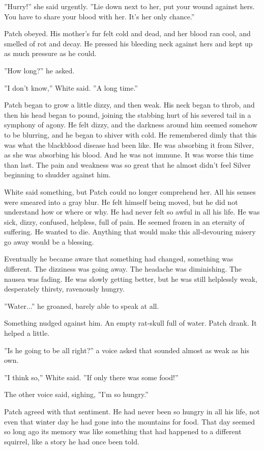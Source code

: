 \documentclass[12pt]{book}
\begin{document}
''Hurry!'' she said urgently. ''Lie down next to her, put your wound against hers. You have to share your blood with her. It's her only chance.''\par
Patch obeyed. His mother's fur felt cold and dead, and her blood ran cool, and smelled of rot and decay. He pressed his bleeding neck against hers and kept up as much pressure as he could.\par
''How long?'' he asked.\par
''I don't know,'' White said. ''A long time.''\par
Patch began to grow a little dizzy, and then weak. His neck began to throb, and then his head began to pound, joining the stabbing hurt of his severed tail in a symphony of agony. He felt dizzy, and the darkness around him seemed somehow to be blurring, and he began to shiver with cold. He remembered dimly that this was what the blackblood disease had been like. He was absorbing it from Silver, as she was absorbing his blood. And he was not immune. It was worse this time than last. The pain and weakness was so great that he almost didn't feel Silver beginning to shudder against him.\par
White said something, but Patch could no longer comprehend her. All his senses were smeared into a gray blur. He felt himself being moved, but he did not understand how or where or why. He had never felt so awful in all his life. He was sick, dizzy, confused, helpless, full of pain. He seemed frozen in an eternity of suffering. He wanted to die. Anything that would make this all-devouring misery go away would be a blessing.\par
Eventually he became aware that something had changed, something was different. The dizziness was going away. The headache was diminishing. The nausea was fading. He was slowly getting better, but he was still helplessly weak, desperately thirsty, ravenously hungry.\par
''Water...'' he groaned, barely able to speak at all.\par
Something nudged against him. An empty rat-skull full of water. Patch drank. It helped a little.\par
''Is he going to be all right?'' a voice asked that sounded almost as weak as his own.\par
''I think so,'' White said. ''If only there was some food!''\par
The other voice said, sighing, ''I'm so hungry.''\par
Patch agreed with that sentiment. He had never been so hungry in all his life, not even that winter day he had gone into the mountains for food. That day seemed so long ago its memory was like something that had happened to a different squirrel, like a story he had once been told.\par
\end{document}
